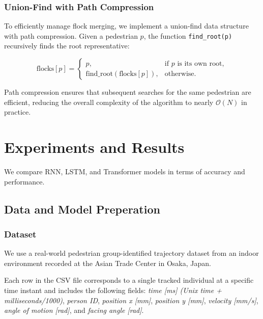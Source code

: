 \documentclass{article}
\begin{document}
\subsubsection{Union-Find with Path Compression}

To efficiently manage flock merging, we implement a union-find data structure with path compression. Given a pedestrian $p$, the function \texttt{find\_root(p)} recursively finds the root representative:

\begin{equation}
    \text{flocks}[p] =
    \begin{cases}
      p, & \text{if } p \text{ is its own root}, \\
      \text{find\_root}(\text{flocks}[p]), & \text{otherwise}.
    \end{cases}
\end{equation}

Path compression ensures that subsequent searches for the same pedestrian are efficient, reducing the overall complexity of the algorithm to nearly $\mathcal{O}(N)$ in practice.



\section{Experiments and Results}

We compare RNN, LSTM, and Transformer models in terms of accuracy and performance.

\subsection{Data and Model Preperation}

\subsubsection{Dataset}

We use a real-world pedestrian group-identified trajectory dataset \cite{zanlungo2015pedestrian} from an indoor environment recorded at the Asian Trade Center in Osaka, Japan.

Each row in the CSV file corresponds to a single tracked individual at a specific time instant and includes the following fields: \textit{time [ms] (Unix time + milliseconds/1000)}, \textit{person ID}, \textit{position x [mm]}, \textit{position y [mm]}, \textit{velocity [mm/s]}, \textit{angle of motion [rad]}, and \textit{facing angle [rad]}.
\end{document}
